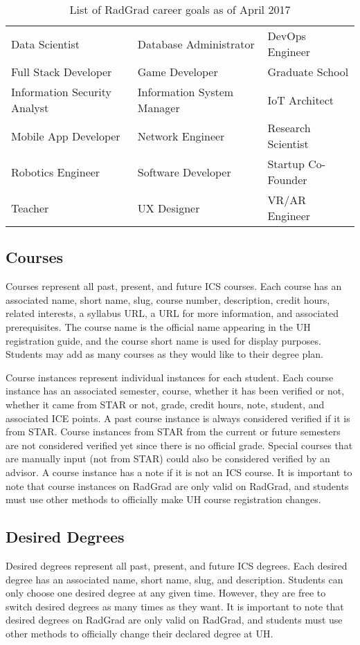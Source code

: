 \begin{table}[h!]
\centering
\begin{tabular}{ l l l } 
 Data Scientist & Database Administrator & DevOps Engineer \\ 
 Full Stack Developer & Game Developer & Graduate School \\ 
 Information Security Analyst & Information System Manager & IoT Architect \\ 
 Mobile App Developer & Network Engineer & Research Scientist \\
 Robotics Engineer & Software Developer & Startup Co-Founder \\
 Teacher & UX Designer & VR/AR Engineer 
\end{tabular}
\caption{List of RadGrad career goals as of April 2017}
\label{table:1}
\end{table}

\subsection{Courses}
Courses represent all past, present, and future ICS courses. Each course has an associated name, short name, slug, course number, description, credit hours, related interests, a syllabus URL, a URL for more information, and associated prerequisites. The course name is the official name appearing in the UH registration guide, and the course short name is used for display purposes. Students may add as many courses as they would like to their degree plan. 

Course instances represent individual instances for each student. Each course instance has an associated semester, course, whether it has been verified or not, whether it came from STAR or not, grade, credit hours, note, student, and associated ICE points. A past course instance is always considered verified if it is from STAR. Course instances from STAR from the current or future semesters are not considered verified yet since there is no official grade. Special courses that are manually input (not from STAR) could also be considered verified by an advisor. A course instance has a note if it is not an ICS course. It is important to note that course instances on RadGrad are only valid on RadGrad, and students must use other methods to officially make UH course registration changes.

\subsection{Desired Degrees}
Desired degrees represent all past, present, and future ICS degrees. Each desired degree has an associated name, short name, slug, and description. Students can only choose one desired degree at any given time. However, they are free to switch desired degrees as many times as they want. It is important to note that desired degrees on RadGrad are only valid on RadGrad, and students must use other methods to officially change their declared degree at UH. 

